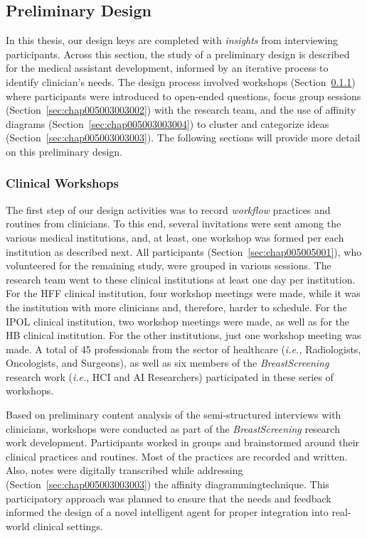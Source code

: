 \subsection{Preliminary Design}
\label{sec:chap005003003}

In this thesis, our design keys are completed with {\it insights} from interviewing participants.
Across this section, the study of a preliminary design is described for the medical assistant development, informed by an iterative process to identify clinician's needs.
The design process involved workshops (Section~\ref{sec:chap005003003001}) where participants were introduced to open-ended questions, focus group sessions (Section~\ref{sec:chap005003003002}) with the research team, and the use of affinity diagrams (Section~\ref{sec:chap005003003004}) to cluster and categorize ideas (Section~\ref{sec:chap005003003003}).
The following sections will provide more detail on this preliminary design.

\subsubsection{Clinical Workshops}
\label{sec:chap005003003001}

The first step of our design activities was to record {\it workflow} practices and routines from clinicians.
To this end, several invitations were sent among the various medical institutions, and, at least, one workshop was formed per each institution as described next.
All participants (Section~\ref{sec:chap005005001}), who volunteered for the remaining study, were grouped in various sessions.
The research team went to these clinical institutions at least one day per institution.
For the \acs{HFF} clinical institution, four workshop meetings were made, while it was the institution with more clinicians and, therefore, harder to schedule.
For the \acs{IPOL} clinical institution, two workshop meetings were made, as well as for the \acs{HB} clinical institution.
For the other institutions, just one workshop meeting was made.
A total of 45 professionals from the sector of healthcare ({\it i.e.,} Radiologists, Oncologists, and Surgeons), as well as six members of the {\it BreastScreening} research work ({\it i.e.}, \ac{HCI} and \ac{AI} Researchers) participated in these series of workshops.

Based on preliminary content analysis of the semi-structured interviews with clinicians, workshops were conducted as part of the {\it BreastScreening} research work development.
Participants worked in groups and brainstormed around their clinical practices and routines.
Most of the practices are recorded and written.
Also, notes were digitally transcribed while addressing (Section~\ref{sec:chap005003003003}) the affinity diagramming\footnotemark[6] technique.
This participatory approach was planned to ensure that the needs and feedback informed the design of a novel intelligent agent for proper integration into real-world clinical settings.

